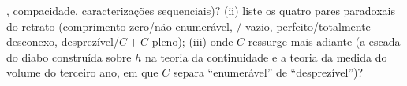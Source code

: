 \begin{problem}[{Problema de fim de semana --- o \omterm{pb:b1:topology:1}{conjunto de Cantor}
dos terços médios: comprimento zero, não enumerável, perfeito e $C + C =
\intcc{0}{2}$}]
\begin{enumerate}
        , compacidade, caracterizações sequenciais)?
        (ii) liste os quatro pares paradoxais do retrato
        (comprimento zero/não enumerável, / vazio,
        perfeito/totalmente desconexo, desprezível/$C+C$ pleno);
        (iii) onde $C$ ressurge mais adiante (a escada do diabo
        construída sobre $h$ na teoria da continuidade e a teoria da
        medida do volume do terceiro ano, em que $C$ separa
        ``enumerável'' de ``desprezível'')?
\end{enumerate}
\end{problem}

